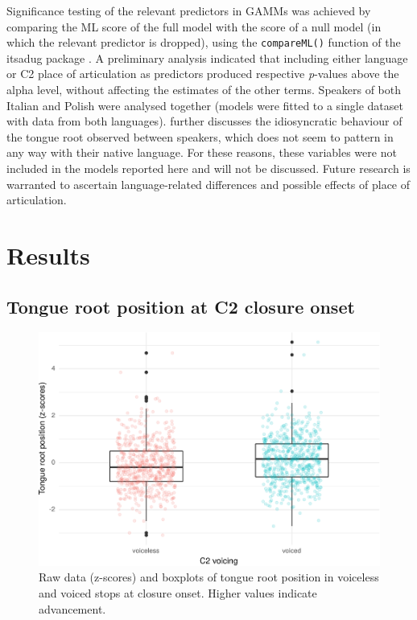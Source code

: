 \documentclass[preprint]{JASAnew}
\begin{document}
Significance testing of the relevant predictors in GAMMs was achieved by
comparing the ML score of the full model with the score of a null model
(in which the relevant predictor is dropped), using the
\texttt{compareML()} function of the itsadug package
\citep{van-rij2017}. A preliminary analysis indicated that including
either language or C2 place of articulation as predictors produced
respective \emph{p}-values above the alpha level, without affecting the
estimates of the other terms. Speakers of both Italian and Polish were
analysed together (models were fitted to a single dataset with data from
both languages).  further discusses the idiosyncratic
behaviour of the tongue root observed between speakers, which does not
seem to pattern in any way with their native language. For these
reasons, these variables were not included in the models reported here
and will not be discussed. Future research is warranted to ascertain
language-related differences and possible effects of place of
articulation.

\hypertarget{results}{%
\section{Results}\label{results}}

\label{s:results}

\hypertarget{tongue-root-position-at-c2-closure-onset}{%
\subsection{Tongue root position at C2 closure
onset}\label{tongue-root-position-at-c2-closure-onset}}

\label{s:tra-lm}

\begin{figure}
\includegraphics[width=\linewidth]{./Figure3-1} \caption{Raw data (z-scores) and boxplots of tongue root position in voiceless and voiced stops at closure onset. Higher values indicate advancement.}\label{f:Figure3}
\end{figure}
\end{document}
